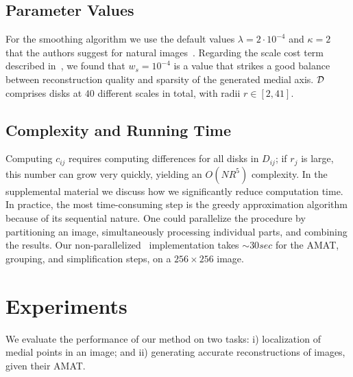 \documentclass[10pt,twocolumn,letterpaper]{article}
\begin{document}
\subsection{Parameter Values}\label{sec:method:parameter}
For the smoothing algorithm we use the default values $\lambda=2\cdot10^{-4}$ and $\kappa=2$ that 
the authors suggest for natural images~\cite{xu2011image}.
Regarding the scale cost term described in~, we found that $w_s=10^{-4}$ is a value that 
strikes a good balance between reconstruction quality and sparsity of the generated medial axis.
$\mathcal{D}$ comprises disks at $40$ different scales in total, with radii $r\in[2,41]$.

\subsection{Complexity and Running Time}\label{sec:method:complexity}
Computing $c_{ij}$ requires computing differences for all disks in $D_{ij}$; if $r_j$ is large, this number can grow very quickly,
yielding an $O(NR^5)$ complexity.
In the supplemental material we discuss how we significantly reduce computation time.
In practice, the most time-consuming step is the greedy approximation algorithm because of its sequential nature.
One could parallelize the procedure by partitioning an image, simultaneously processing individual parts,
and combining the results.
Our non-parallelized \matlab\ implementation takes $\sim 30sec$ for the AMAT, grouping, and simplification steps, on a $256\times256$ image.




\section{Experiments}\label{sec:experiments}
We evaluate the performance of our method on two tasks: 
i) localization of medial points in an image; and
ii) generating accurate reconstructions of images, given their AMAT.
\end{document}

